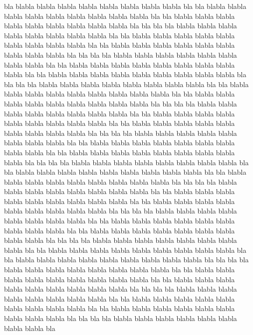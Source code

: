 \documentclass[12pt,a4paper,english]{book}
\begin{document}
bla blabla blabla blabla blabla blabla blabla blabla blabla bla
bla blabla blabla blabla blabla blabla blabla blabla blabla blabla bla
bla blabla blabla blabla blabla blabla blabla blabla blabla blabla bla
bla bla
bla blabla blabla blabla blabla blabla blabla blabla blabla bla
bla blabla blabla blabla blabla blabla blabla blabla blabla blabla bla
bla blabla blabla blabla blabla blabla blabla blabla blabla blabla bla
bla bla
bla blabla blabla blabla blabla blabla blabla blabla blabla bla
bla blabla blabla blabla blabla blabla blabla blabla blabla blabla bla
bla blabla blabla blabla blabla blabla blabla blabla blabla blabla bla
bla bla
bla blabla blabla blabla blabla blabla blabla blabla blabla bla
bla blabla blabla blabla blabla blabla blabla blabla blabla blabla bla
bla blabla blabla blabla blabla blabla blabla blabla blabla blabla bla
bla bla
bla blabla blabla blabla blabla blabla blabla blabla blabla bla
bla blabla blabla blabla blabla blabla blabla blabla blabla blabla bla
bla blabla blabla blabla blabla blabla blabla blabla blabla blabla bla
bla bla
bla blabla blabla blabla blabla blabla blabla blabla blabla bla
bla blabla blabla blabla blabla blabla blabla blabla blabla blabla bla
bla blabla blabla blabla blabla blabla blabla blabla blabla blabla bla
bla bla
bla blabla blabla blabla blabla blabla blabla blabla blabla bla
bla blabla blabla blabla blabla blabla blabla blabla blabla blabla bla
bla blabla blabla blabla blabla blabla blabla blabla blabla blabla bla
bla bla
bla blabla blabla blabla blabla blabla blabla blabla blabla bla
bla blabla blabla blabla blabla blabla blabla blabla blabla blabla bla
bla blabla blabla blabla blabla blabla blabla blabla blabla blabla bla
bla bla
bla blabla blabla blabla blabla blabla blabla blabla blabla bla
bla blabla blabla blabla blabla blabla blabla blabla blabla blabla bla
bla blabla blabla blabla blabla blabla blabla blabla blabla blabla bla
bla bla
bla blabla blabla blabla blabla blabla blabla blabla blabla bla
bla blabla blabla blabla blabla blabla blabla blabla blabla blabla bla
bla blabla blabla blabla blabla blabla blabla blabla blabla blabla bla
bla bla
bla blabla blabla blabla blabla blabla blabla blabla blabla bla
bla blabla blabla blabla blabla blabla blabla blabla blabla blabla bla
bla blabla blabla blabla blabla blabla blabla blabla blabla blabla bla
bla bla
bla blabla blabla blabla blabla blabla blabla blabla blabla bla
bla blabla blabla blabla blabla blabla blabla blabla blabla blabla bla
bla blabla blabla blabla blabla blabla blabla blabla blabla blabla bla
bla bla
bla blabla blabla blabla blabla blabla blabla blabla blabla bla
\end{document}
